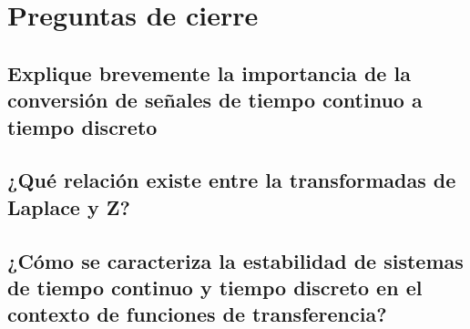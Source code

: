 \section{Preguntas de cierre}

\subsection{Explique brevemente la importancia de la conversión de señales de tiempo continuo a tiempo discreto}

\subsection{¿Qué relación existe entre la transformadas de Laplace y Z?}

\subsection{¿Cómo se caracteriza la estabilidad de sistemas de tiempo continuo y tiempo discreto en el contexto de funciones de transferencia?}